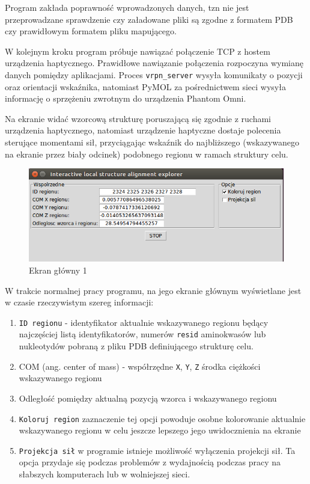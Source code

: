 \documentclass[licencjacka]{pracamgr}
\begin{document}
Program zakłada poprawność wprowadzonych danych, tzn nie jest przeprowadzane sprawdzenie czy załadowane pliki są zgodne z formatem PDB czy prawidłowym formatem pliku mapującego.

W kolejnym kroku program próbuje nawiązać połączenie TCP z hostem urządzenia haptycznego. Prawidłowe nawiązanie połączenia rozpoczyna wymianę danych pomiędzy aplikacjami. Proces \texttt{vrpn\_server} wysyła komunikaty o pozycji oraz orientacji wskaźnika, natomiast PyMOL za pośrednictwem sieci wysyła informację o sprzężeniu zwrotnym do urządzenia Phantom Omni. 

Na ekranie widać wzorcową strukturę poruszającą się zgodnie z ruchami urządzenia haptycznego, natomiast urządzenie haptyczne dostaje polecenia sterujące momentami sił, przyciągając wskaźnik do najbliższego (wskazywanego na ekranie przez biały odcinek) podobnego regionu w ramach struktury celu.

\begin{figure}[H]
\centering
\includegraphics[scale=0.7,center]{explorer_stats}
\caption{Ekran główny 1}
\end{figure}

W trakcie normalnej pracy programu, na jego ekranie głównym wyświetlane jest w czasie rzeczywistym szereg informacji:
\begin{enumerate}

\item \texttt{ID regionu} - identyfikator aktualnie wskazywanego regionu będący najczęściej listą identyfikatorów, numerów \texttt{resid} aminokwasów lub nukleotydów pobraną z pliku PDB definiującego strukturę celu.

\item COM (ang. center of mass) - współrzędne \texttt{X}, \texttt{Y}, \texttt{Z} środka ciężkości wskazywanego regionu

\item Odległość pomiędzy aktualną pozycją wzorca i wskazywanego regionu

\item \texttt{Koloruj region} zaznaczenie tej opcji powoduje osobne kolorowanie aktualnie wskazywanego regionu w celu jeszcze lepszego jego uwidocznienia na ekranie

\item \texttt{Projekcja sił} w programie istnieje możliwość wyłączenia projekcji sił. Ta opcja przydaje się podczas problemów z wydajnością podczas pracy na słabszych komputerach lub w wolniejszej sieci.

\end{enumerate}
\end{document}
